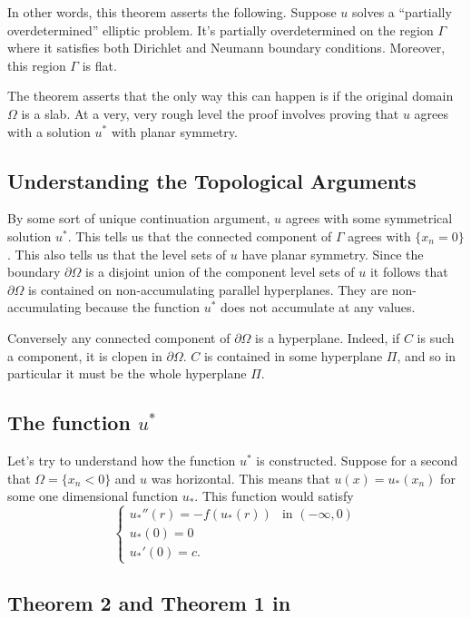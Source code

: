 In other words, this theorem asserts the following. Suppose $u$ solves a ``partially overdetermined'' elliptic problem. It's partially overdetermined on the region $\Gamma$ where it satisfies both Dirichlet and Neumann boundary conditions. Moreover, this region $\Gamma$ is flat.

The theorem asserts that the only way this can happen is if the original domain $\Omega$ is a slab. At a very, very rough level the proof involves proving that $u$ agrees with a solution $u^*$ with planar symmetry.

\subsection{Understanding the Topological Arguments}

By some sort of unique continuation argument, $u$ agrees with some symmetrical solution $u^*$. This tells us that the connected component of $\Gamma$ agrees with $\{x_n = 0\}$. This also tells us that the level sets of $u$ have planar symmetry. Since the boundary $\partial \Omega$ is a disjoint union of the component level sets of $u$ it follows that $\partial \Omega$ is contained on non-accumulating parallel hyperplanes. They are non-accumulating because the function $u^*$ does not accumulate at any values.

Conversely any connected component of $\partial \Omega$ is a hyperplane. Indeed, if $C$ is such a component, it is clopen in $\partial \Omega$. $C$ is contained in some hyperplane $\Pi$, and so in particular it must be the whole hyperplane $\Pi$.

\subsection{The function $u^*$}
Let's try to understand how the function $u^*$ is constructed. Suppose for a second that $\Omega = \{x_n < 0\}$ and $u$ was horizontal. This means that $u(x) = u_*(x_n)$ for some one dimensional function $u_*$. This function would satisfy
\[
\begin{cases}
    u_*''(r) = -f(u_*(r)) & \text{in $(-\infty, 0)$} \\
    u_*(0) = 0 & \\
    u_*'(0) = c.
\end{cases}
\]

\subsection{Theorem 2 and Theorem 1 in \cite{FV13}}

